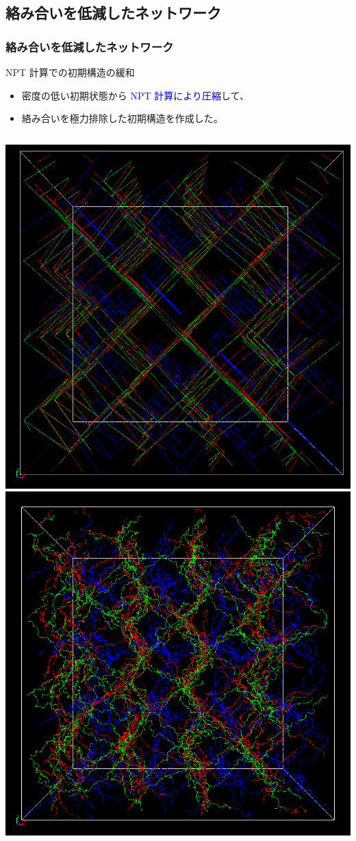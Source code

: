\documentclass[12pt, dvipdfmx]{beamer}
\begin{document}
\subsection{絡み合いを低減したネットワーク}
\begin{frame}
	\frametitle{絡み合いを低減したネットワーク}
		\begin{exampleblock}{NPT 計算での初期構造の緩和}
			\begin{itemize}
				\item 密度の低い初期状態から \textcolor{blue}{NPT 計算により圧縮}して、
				\item \alert{絡み合いを極力排除した初期構造}を作成した。
			\end{itemize}
		\end{exampleblock}

		\begin{columns}[T, onlytextwidth]
				\includegraphics[width=.9\textwidth]{NPT_00.png}
				\includegraphics[width=.9\textwidth]{NPT_11.png}

\end{columns}
\end{frame}
\end{document}
